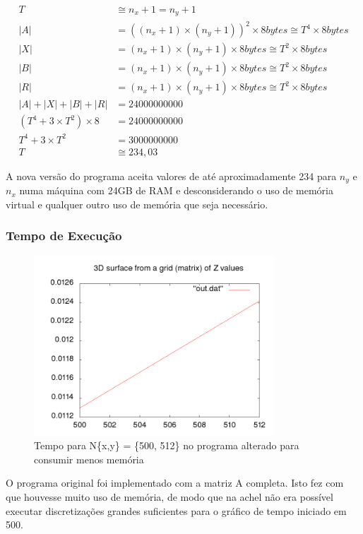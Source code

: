 \documentclass[12pt]{article}
\begin{document}
	\begin{align}
		T &\cong n_x + 1 = n_y + 1 \\
		|A| &= ((n_x+1)\times(n_y+1))^2\times8 bytes \cong T^4\times8 bytes \\
		|X| &= (n_x+1)\times(n_y+1)\times8 bytes \cong T^2\times8 bytes \\
		|B| &= (n_x+1)\times(n_y+1)\times8 bytes \cong T^2\times8 bytes \\
		|R| &= (n_x+1)\times(n_y+1)\times8 bytes \cong T^2\times8 bytes \\
		|A| + |X| + |B| + |R| &= 24000000000 \\
		(T^4 + 3\times T^2)\times8 &= 24000000000 \\
		T^4 + 3\times T^2 &= 3000000000 \\
		T &\cong 234,03
	\end{align}

	A nova versão do programa aceita valores de até aproximadamente 234 para $n_y$ e $n_x$ numa máquina com 24GB de 	RAM e desconsiderando o uso de memória virtual e qualquer outro uso de memória que seja necessário.

	\subsubsection{Tempo de Execução}
	\begin{figure}[ht!]
		\centering
		\includegraphics[width=90mm]{oldtime.png}
		\caption{Tempo para N\{x,y\} = \{500, 512\} no programa alterado para consumir menos memória
		\label{overflow}}
	\end{figure}
	
	O programa original foi implementado com a matriz A completa.
	Isto fez com que houvesse muito uso de memória, de modo que na achel não era possível executar discretizações grandes suficientes para o gráfico de tempo iniciado em 500.
	
\end{document}
